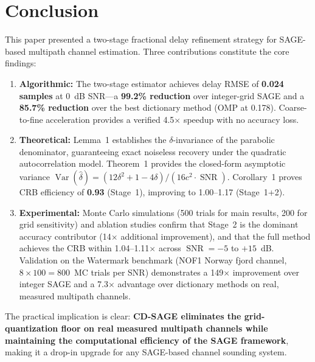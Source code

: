 \documentclass[a4paper,fleqn]{cas-dc}
\DeclareMathOperator{\Var}{Var}
\DeclareMathOperator{\SNR}{SNR}
\begin{document}
\section{Conclusion}
\label{sec:conclusion}

This paper presented a two-stage fractional delay refinement strategy for SAGE-based multipath channel estimation. Three contributions constitute the core findings:

\begin{enumerate}
\item \textbf{Algorithmic:} The two-stage estimator achieves delay RMSE of \textbf{0.024 samples} at 0~dB SNR---a \textbf{99.2\% reduction} over integer-grid SAGE and a \textbf{85.7\% reduction} over the best dictionary method (OMP at 0.178). Coarse-to-fine acceleration provides a verified 4.5$\times$ speedup with no accuracy loss.

\item \textbf{Theoretical:} Lemma~1 establishes the $\delta$-invariance of the parabolic denominator, guaranteeing exact noiseless recovery under the quadratic autocorrelation model. Theorem~1 provides the closed-form asymptotic variance $\Var(\hat{\delta}) = (12\delta^2+1-4\delta)/(16c^2 \cdot \SNR)$. Corollary~1 proves CRB efficiency of \textbf{0.93} (Stage~1), improving to 1.00--1.17 (Stage~1+2).

\item \textbf{Experimental:} Monte Carlo simulations (500 trials for main results, 200 for grid sensitivity) and ablation studies confirm that Stage~2 is the dominant accuracy contributor (14$\times$ additional improvement), and that the full method achieves the CRB within 1.04--1.11$\times$ across $\SNR = -5$ to $+15$~dB. Validation on the Watermark benchmark (NOF1 Norway fjord channel, $8\times100 = 800$~MC trials per SNR) demonstrates a 149$\times$ improvement over integer SAGE and a 7.3$\times$ advantage over dictionary methods on real, measured multipath channels.
\end{enumerate}

The practical implication is clear: \textbf{CD-SAGE eliminates the grid-quantization floor on real measured multipath channels while maintaining the computational efficiency of the SAGE framework}, making it a drop-in upgrade for any SAGE-based channel sounding system.
\end{document}
